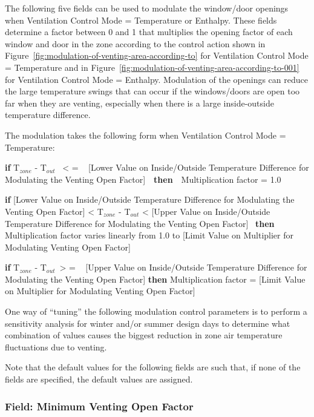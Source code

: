 The following five fields can be used to modulate the window/door openings when Ventilation Control Mode = Temperature or Enthalpy. These fields determine a factor between 0 and 1 that multiplies the opening factor of each window and door in the zone according to the control action shown in Figure~\ref{fig:modulation-of-venting-area-according-to} for Ventilation Control Mode = Temperature and in Figure~\ref{fig:modulation-of-venting-area-according-to-001} for Ventilation Control Mode = Enthalpy. Modulation of the openings can reduce the large temperature swings that can occur if the windows/doors are open too far when they are venting, especially when there is a large inside-outside temperature difference.

The modulation takes the following form when Ventilation Control Mode = Temperature:

\textbf{if} T\(_{zone}\) - T\(_{out}\) ~\textless{} = ~ {[}Lower Value on Inside/Outside Temperature Difference for Modulating the Venting Open Factor{]}~~\textbf{then}~~Multiplication factor = 1.0

\textbf{if} {[}Lower Value on Inside/Outside Temperature Difference for Modulating the Venting Open Factor{]} \textless{} T\(_{zone}\) - T\(_{out}\) \textless{} {[}Upper Value on Inside/Outside Temperature Difference for Modulating the Venting Open Factor{]}~ \textbf{then} Multiplication factor varies linearly from 1.0 to {[}Limit Value on Multiplier for Modulating Venting Open Factor{]}

\textbf{if} T\(_{zone}\) - T\(_{out}\)~\textgreater{} = ~ {[}Upper Value on Inside/Outside Temperature Difference for Modulating the Venting Open Factor{]} \textbf{then} Multiplication factor = {[}Limit Value on Multiplier for Modulating Venting Open Factor{]}

One way of ``tuning'' the following modulation control parameters is to perform a sensitivity analysis for winter and/or summer design days to determine what combination of values causes the biggest reduction in zone air temperature fluctuations due to venting.

Note that the default values for the following fields are such that, if none of the fields are specified, the default values are assigned.

\subsubsection{Field: Minimum Venting Open Factor}\label{field-minimum-venting-open-factor}

